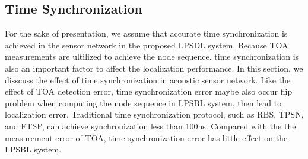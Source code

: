 \subsection{Time Synchronization }

For the sake of presentation, we assume that accurate time synchronization is achieved in the sensor network in the proposed LPSDL system.
Because TOA measurements are ultilized to achieve the node sequence, time synchronization is also an important factor to affect the localization performance. 
In this section, we disscuss the effect of time synchronization in acoustic sensor network.
Like the effect of TOA detection error, time synchronization error maybe also occur flip problem when computing the node sequence in LPSBL system, then lead to localization error.
Traditional time synchronization protocol, such as RBS, TPSN, and FTSP, can achieve synchronization less than 100ns. 
Compared with the the measurement error of TOA, time synchronization error has little effect on the LPSBL system.





